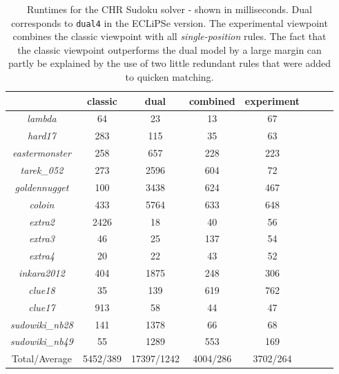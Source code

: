 \begin{table}[H]
\footnotesize
\centering
\bgroup
\def\arraystretch{1.3}
\begin{tabular}{cccc|ccc|c}
\multicolumn{1}{l}{} & classic & dual & combined & experiment \\ \hline
\textit{lambda} & 64 & 23 & 13 & 67  \\
\textit{hard17} & 283 & 115 & 35 & 63  \\
\textit{eastermonster} & 258 & 657 & 228 & 223  \\
\textit{tarek\_052} & 273 & 2596 & 604 & 72  \\
\textit{goldennugget} & 100 & 3438 & 624 & 467  \\
\textit{coloin} & 433 & 5764 & 633 & 648  \\
\textit{extra2} & 2426 & 18 & 40 & 56  \\
\textit{extra3} & 46 & 25 & 137 & 54  \\
\textit{extra4} & 20 & 22 & 43 & 52  \\
\textit{inkara2012} & 404 & 1875 & 248 & 306  \\
\textit{clue18} & 35 & 139 & 619 & 762  \\
\textit{clue17} & 913 & 58 & 44 & 47  \\
\textit{sudowiki\_nb28} & 141 & 1378 & 66 & 68  \\
\textit{sudowiki\_nb49} & 55 & 1289 & 553 & 169  \\\hline
Total/Average & 5452/389 & 17397/1242 & 4004/286 & 3702/264  \\
\end{tabular}
\egroup
\caption{Runtimes for the CHR Sudoku solver - shown in milliseconds. Dual corresponds to \texttt{dual4} in the ECLiPSe version. The experimental viewpoint combines the classic viewpoint with all \textit{single-position} rules. The fact that the classic viewpoint outperforms the dual model by a large margin can partly be explained by the use of two little redundant rules that were added to quicken matching.}
\label{tab:res4}
\end{table}